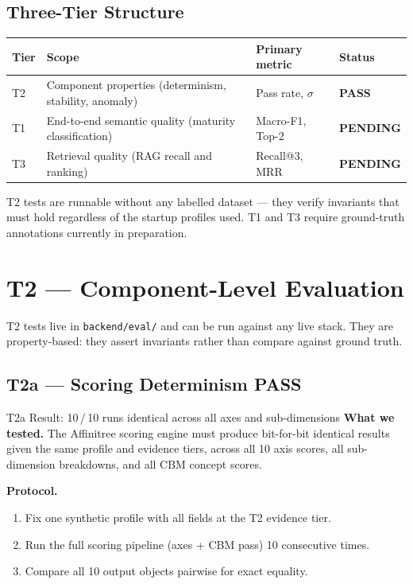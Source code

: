 \documentclass[11pt,a4paper]{article}
\newcommand{\ppass}{\colorbox{PassBg}{\small\textbf{PASS}}}
\newcommand{\ppending}{\colorbox{PendingBg}{\small\textbf{PENDING}}}
\begin{document}
\subsection{Three-Tier Structure}

\begin{center}\small
\begin{tabular}{@{}llll@{}}
\toprule
\textbf{Tier} & \textbf{Scope} & \textbf{Primary metric} & \textbf{Status} \\
\midrule
T2 & Component properties (determinism, stability, anomaly) & Pass rate, $\sigma$ & \ppass \\
T1 & End-to-end semantic quality (maturity classification)  & Macro-F1, Top-2     & \ppending \\
T3 & Retrieval quality (RAG recall and ranking)             & Recall@3, MRR       & \ppending \\
\bottomrule
\end{tabular}
\end{center}

T2 tests are runnable without any labelled dataset — they verify invariants that must
hold regardless of the startup profiles used.
T1 and T3 require ground-truth annotations currently in preparation.

\section{T2 — Component-Level Evaluation}

T2 tests live in \texttt{backend/eval/} and can be run against any live stack.
They are property-based: they assert invariants rather than compare against ground truth.

\subsection{T2a — Scoring Determinism \ppass}

\begin{passbox}{T2a Result: 10\,/\,10 runs identical across all axes and sub-dimensions}
\textbf{What we tested.}
The Affinitree scoring engine must produce bit-for-bit identical results given the same
profile and evidence tiers, across all 10 axis scores, all sub-dimension breakdowns,
and all CBM concept scores.

\textbf{Protocol.}
\begin{enumerate}
  \item Fix one synthetic profile with all fields at the T2 evidence tier.
  \item Run the full scoring pipeline (axes + CBM pass) 10 consecutive times.
  \item Compare all 10 output objects pairwise for exact equality.
\end{enumerate}
\end{passbox}
\end{document}
